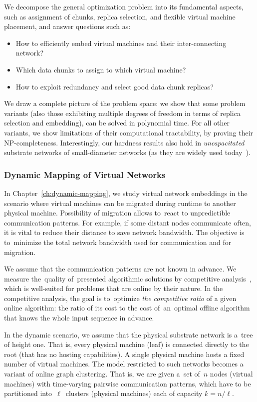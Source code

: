We decompose the general optimization problem into its fundamental aspects, such as
assignment of chunks, replica selection, and flexible virtual machine
placement, and answer questions such as:
\begin{itemize}
\item How to efficiently embed virtual machines and their inter-connecting network?
\item Which data chunks to assign to which virtual machine?
\item How to exploit redundancy and select good data chunk replicas?
\end{itemize}

We draw a complete picture of the problem space: we show that
some problem variants (also those exhibiting multiple degrees of freedom in terms of
replica selection and embedding),
can be solved in polynomial time. For all other variants, we show limitations of their
computational tractability, by proving their NP-completeness. Interestingly,
our hardness results also hold in \emph{uncapacitated} substrate
networks of small-diameter networks (as they are
widely used today~\cite{fattree}).


\subsubsection{Dynamic Mapping of Virtual Networks}
\label{sec:contributions-dynamic-mapping}

In Chapter~\ref{ch:dynamic-mapping}, we study virtual network embeddings in the scenario where virtual machines can be migrated during runtime to another physical machine.
Possibility of migration allows to~react to unpredictible communication patterns.
For example, if some distant nodes communicate often, it is vital to reduce their distance to save network bandwidth.
The objective is to~minimize the total network bandwidth used for communication and for migration.

We assume that the communication patterns are not known in advance.
We measure the~quality of~presented algorithmic solutions by competitive analysis~\cite{borodin-book}, which is well-suited for problems that are online by their nature.
In the competitive analysis, the goal is to~optimize \emph{the competitive ratio} of a given online algorithm: the ratio of its cost to the cost of~an~optimal offline algorithm that knows the whole input sequence in advance.

In the dynamic scenario, we assume that the physical substrate network is a~tree of height one.
That is, every physical machine (leaf) is connected directly to the root (that has no hosting capabilities).
A single physical machine hosts a fixed number of virtual machines.
The model restricted to such networks becomes a variant of online graph clustering.
That is, we are given a~set of~$n$ nodes (virtual machines) with time-varying pairwise
communication patterns, which have to be partitioned into~$\ell$~clusters (physical machines) each of
capacity $k=n/\ell$.

